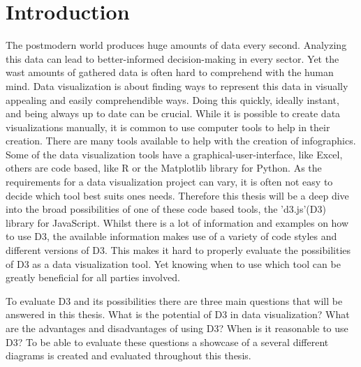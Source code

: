 \chapter{Introduction}


The postmodern world produces huge amounts of data every second. Analyzing this data can lead to better-informed decision-making in every sector. Yet the wast amounts of gathered data is often hard to comprehend with the human mind. Data visualization is about finding ways to represent this data in visually appealing and easily comprehendible ways\cite{sadiku2016data}. Doing this quickly, ideally instant, and being always up to date can be crucial. While it is possible to create data visualizations manually, it is common to use computer tools to help in their creation. There are many tools available to help with the creation of infographics. Some of the data visualization tools have a graphical-user-interface, like Excel\cite{excel}, others are code based, like R\cite{r} or the Matplotlib\cite{matplotlib} library for Python. As the requirements for a data visualization project can vary, it is often not easy to decide which tool best suits ones needs. Therefore this thesis will be a deep dive into the broad possibilities of one of these code based tools, the 'd3.js'(D3) library for JavaScript. Whilst there is a lot of information and examples on how to use D3, the available information makes use of a variety of code styles and different versions of D3. This makes it hard to properly evaluate the possibilities of D3 as a data visualization tool. Yet knowing when to use which tool can be greatly beneficial for all parties involved.

To evaluate D3 and its possibilities there are three main questions that will be answered in this thesis. What is the potential of D3 in data visualization? What are the advantages and disadvantages of using D3? When is it reasonable to use D3? To be able to evaluate these questions a showcase of a several different diagrams is created and evaluated throughout this thesis.
